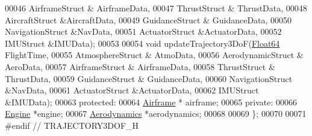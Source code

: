 \begin{DoxyCode}
00046                             AirframeStruct & AirframeData,
00047                             ThrustStruct & ThrustData,
00048                             AircraftStruct &AircraftData,
00049                             GuidanceStruct & GuidanceData,
00050                             NavigationStruct &NavData,
00051                             ActuatorStruct &ActuatorData,
00052                             IMUStruct &IMUData);
00053 
00054     \textcolor{keywordtype}{void} updateTrajectory3DoF(\hyperlink{group___tools_ga3f1431cb9f76da10f59246d1d743dc2c}{Float64} FlightTime,
00055                                 AtmosphereStruct & AtmoData,
00056                                 AerodynamicStruct & AeroData,
00057                                 AirframeStruct & AirframeData,
00058                                 ThrustStruct & ThrustData,
00059                                 GuidanceStruct & GuidanceData,
00060                                 NavigationStruct &NavData,
00061                                 ActuatorStruct &ActuatorData,
00062                                 IMUStruct &IMUData);
00063 \textcolor{keyword}{protected}:
00064     \hyperlink{group___airframe_class_airframe}{Airframe} * airframe;
00065 \textcolor{keyword}{private}:
00066     \hyperlink{group___engine_class_engine}{Engine}         *engine;
00067     \hyperlink{group___aerodynamic_class_aerodynamics}{Aerodynamics} *aerodynamics;
00068     
00069 \};
00070 
00071 \textcolor{preprocessor}{#endif // TRAJECTORY3DOF\_H}
\end{DoxyCode}
